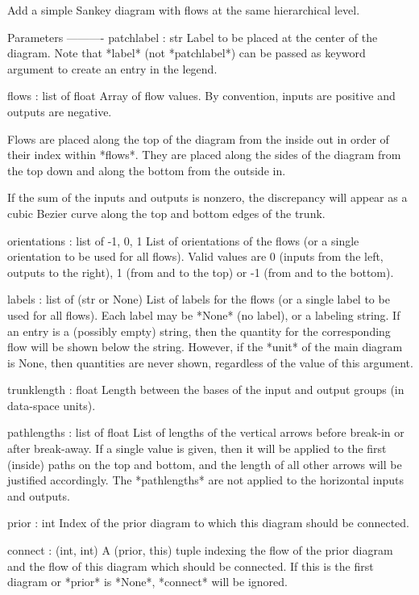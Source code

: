 \begin{DoxyVerb}Add a simple Sankey diagram with flows at the same hierarchical level.

Parameters
----------
patchlabel : str
    Label to be placed at the center of the diagram.
    Note that *label* (not *patchlabel*) can be passed as keyword
    argument to create an entry in the legend.

flows : list of float
    Array of flow values.  By convention, inputs are positive and
    outputs are negative.

    Flows are placed along the top of the diagram from the inside out
    in order of their index within *flows*.  They are placed along the
    sides of the diagram from the top down and along the bottom from
    the outside in.

    If the sum of the inputs and outputs is
    nonzero, the discrepancy will appear as a cubic Bezier curve along
    the top and bottom edges of the trunk.

orientations : list of {-1, 0, 1}
    List of orientations of the flows (or a single orientation to be
    used for all flows).  Valid values are 0 (inputs from
    the left, outputs to the right), 1 (from and to the top) or -1
    (from and to the bottom).

labels : list of (str or None)
    List of labels for the flows (or a single label to be used for all
    flows).  Each label may be *None* (no label), or a labeling string.
    If an entry is a (possibly empty) string, then the quantity for the
    corresponding flow will be shown below the string.  However, if
    the *unit* of the main diagram is None, then quantities are never
    shown, regardless of the value of this argument.

trunklength : float
    Length between the bases of the input and output groups (in
    data-space units).

pathlengths : list of float
    List of lengths of the vertical arrows before break-in or after
    break-away.  If a single value is given, then it will be applied to
    the first (inside) paths on the top and bottom, and the length of
    all other arrows will be justified accordingly.  The *pathlengths*
    are not applied to the horizontal inputs and outputs.

prior : int
    Index of the prior diagram to which this diagram should be
    connected.

connect : (int, int)
    A (prior, this) tuple indexing the flow of the prior diagram and
    the flow of this diagram which should be connected.  If this is the
    first diagram or *prior* is *None*, *connect* will be ignored.


\end{DoxyVerb}
